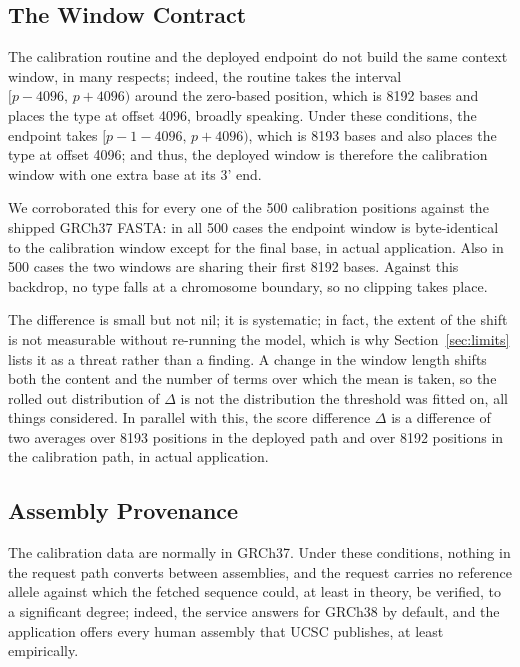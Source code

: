 \documentclass[10pt,journal]{IEEEtran}
\begin{document}
\subsection{The Window Contract}
\label{sec:res-window}

The calibration routine and the deployed endpoint do not build the same context window, in many respects; indeed, the routine takes the interval $[p-4096,\,p+4096)$ around the zero-based position, which is 8192 bases and places the type at offset 4096, broadly speaking. Under these conditions, the endpoint takes $[p-1-4096,\,p+4096)$, which is 8193 bases and also places the type at offset 4096; and thus, the deployed window is therefore the calibration window with one extra base at its 3' end.

We corroborated this for every one of the 500 calibration positions against the shipped GRCh37 FASTA: in all 500 cases the endpoint window is byte-identical to the calibration window except for the final base, in actual application. Also in 500 cases the two windows are sharing their first 8192 bases. Against this backdrop, no type falls at a chromosome boundary, so no clipping takes place.

The difference is small but not nil; it is systematic; in fact, the extent of the shift is not measurable without re-running the model, which is why Section~\ref{sec:limits} lists it as a threat rather than a finding. A change in the window length shifts both the content and the number of terms over which the mean is taken, so the rolled out distribution of $\Delta$ is not the distribution the threshold was fitted on, all things considered. In parallel with this, the score difference $\Delta$ is a difference of two averages over 8193 positions in the deployed path and over 8192 positions in the calibration path, in actual application.

\subsection{Assembly Provenance}
\label{sec:res-assembly}

The calibration data are normally in GRCh37. Under these conditions, nothing in the request path converts between assemblies, and the request carries no reference allele against which the fetched sequence could, at least in theory, be verified, to a significant degree; indeed, the service answers for GRCh38 by default, and the application offers every human assembly that UCSC publishes, at least empirically.
\end{document}
